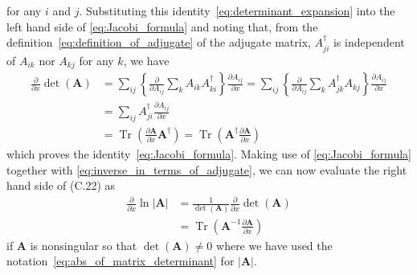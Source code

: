 \documentclass[12pt,a4paper]{article}
\begin{document}
for any $i$ and $j$.
Substituting this identity~\eqref{eq:determinant_expansion} into
the left hand side of \eqref{eq:Jacobi_formula}
and noting that, from the definition~\eqref{eq:definition_of_adjugate} of the adjugate matrix,
$A_{ji}^{\dagger}$ is independent of $A_{ik}$ nor $A_{kj}$ for any $k$,
we have
\begin{align}
\frac{\partial}{\partial x} \operatorname{det}\left(\mathbf{A}\right) &=
\sum_{ij} \left\{ \frac{\partial}{\partial A_{ij}} \sum_{k} A_{ik} A_{ki}^{\dagger} \right\}
  \frac{\partial A_{ij}}{\partial x} =
\sum_{ij} \left\{ \frac{\partial}{\partial A_{ij}} \sum_{k} A_{jk}^{\dagger} A_{kj} \right\}
  \frac{\partial A_{ij}}{\partial x} \\
&= \sum_{ij} A_{ji}^{\dagger} \frac{\partial A_{ij}}{\partial x} \\
&= 
\operatorname{Tr}\left(\frac{\partial\mathbf{A}}{\partial x}\mathbf{A}^{\dagger}\right) =
\operatorname{Tr}\left(\mathbf{A}^{\dagger}\frac{\partial\mathbf{A}}{\partial x}\right)
\end{align}
which proves the identity~\eqref{eq:Jacobi_formula}.
Making use of \eqref{eq:Jacobi_formula}
together with \eqref{eq:inverse_in_terms_of_adjugate},
we can now evaluate the right hand side of (C.22) as
\begin{align}
\frac{\partial}{\partial x} \ln \left|\mathbf{A}\right| &=
\frac{1}{\operatorname{det}\left(\mathbf{A}\right)}
\frac{\partial}{\partial x} \operatorname{det}\left(\mathbf{A}\right) \\
&=
\operatorname{Tr}\left(\mathbf{A}^{-1}\frac{\partial\mathbf{A}}{\partial x}\right)
\end{align}
if $\mathbf{A}$ is nonsingular so that $\operatorname{det}(\mathbf{A}) \neq 0$
where we have used the notation~\eqref{eq:abs_of_matrix_determinant} for $\left|\mathbf{A}\right|$.
\end{document}
